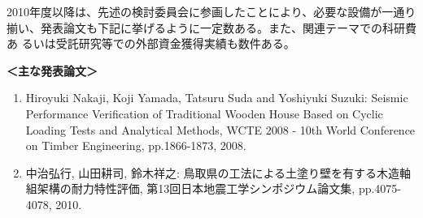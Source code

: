 \documentclass[11pt,a4paper,uplatex,dvipdfmx]{ujarticle} 		%
\newcommand{\研究課題名}{伝統的な木造土塗り壁の復元力に及ぼす軸組の影響に関する実験研究}
\newcommand{\研究機関名}{公立鳥取環境大学}
\newcommand{\研究代表者氏名}{中治弘行}
\newcommand{\me}{{Hiroyuki Nakaji}}
\newcommand{\私}{{\研究代表者氏名}}
\newcommand{\研究期間の最終元号年度}{8}  %
\begin{document}
2010年度以降は、先述の検討委員会に参画したことにより、必要な設備が一通り
揃い、発表論文も下記に挙げるように一定数ある。また、関連テーマでの科研費あ
るいは受託研究等での外部資金獲得実績も数件ある。
\vspace{0.5\baselineskip}

{\parindent=0pt
  \textbf{＜主な発表論文＞}}
\vspace{-1ex}

\begin{enumerate}
  \small
  \itemsep=-2pt

  



\item \label{pub:wcte2008}
  \me{}, Koji Yamada, Tatsuru Suda and   Yoshiyuki Suzuki:
  Seismic Performance Verification of
  Traditional Wooden House Based on Cyclic Loading Tests and
  Analytical Methods,
  WCTE 2008 - 10th World
  Conference on Timber Engineering, pp.1866-1873, 2008. %


\item \label{pub:jees2010}
  \私{}, 山田耕司, 鈴木祥之:
  鳥取県の工法による土塗り壁を有する木造軸組架構の耐力特性評価,
  第13回日本地震工学シンポジウム論文集, pp.4075-4078, 2010. %


\end{enumerate}
\end{document}
